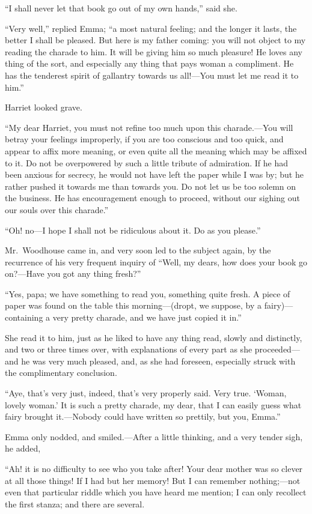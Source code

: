 ``I shall never let that book go out of my own hands,'' said she.

``Very well,'' replied Emma; ``a most natural feeling; and the longer
it lasts, the better I shall be pleased.  But here is my father
coming: you will not object to my reading the charade to him.
It will be giving him so much pleasure! He loves any thing of
the sort, and especially any thing that pays woman a compliment.
He has the tenderest spirit of gallantry towards us all!---You must
let me read it to him.''

Harriet looked grave.

``My dear Harriet, you must not refine too much upon this
charade.---You will betray your feelings improperly, if you are
too conscious and too quick, and appear to affix more meaning,
or even quite all the meaning which may be affixed to it.
Do not be overpowered by such a little tribute of admiration.
If he had been anxious for secrecy, he would not have left the paper
while I was by; but he rather pushed it towards me than towards you.
Do not let us be too solemn on the business.  He has encouragement
enough to proceed, without our sighing out our souls over this charade.''

``Oh! no---I hope I shall not be ridiculous about it.  Do as you please.''

Mr.\ Woodhouse came in, and very soon led to the subject again,
by the recurrence of his very frequent inquiry of ``Well, my dears,
how does your book go on?---Have you got any thing fresh?''

``Yes, papa; we have something to read you, something quite fresh.
A piece of paper was found on the table this morning---(dropt,
we suppose, by a fairy)---containing a very pretty charade, and we
have just copied it in.''

She read it to him, just as he liked to have any thing read,
slowly and distinctly, and two or three times over, with explanations
of every part as she proceeded---and he was very much pleased, and,
as she had foreseen, especially struck with the complimentary conclusion.

``Aye, that's very just, indeed, that's very properly said.
Very true.  `Woman, lovely woman.' It is such a pretty charade,
my dear, that I can easily guess what fairy brought it.---Nobody
could have written so prettily, but you, Emma.''

Emma only nodded, and smiled.---After a little thinking,
and a very tender sigh, he added,

``Ah! it is no difficulty to see who you take after! Your dear mother
was so clever at all those things! If I had but her memory! But I
can remember nothing;---not even that particular riddle which you
have heard me mention; I can only recollect the first stanza;
and there are several.

